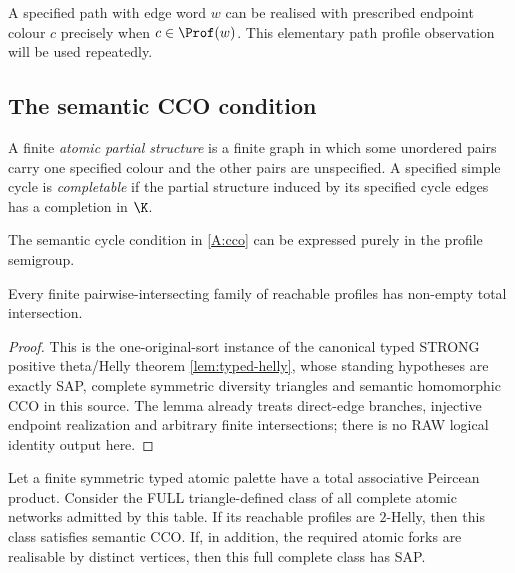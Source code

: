 A specified path with edge word \(w\) can be realised with prescribed
endpoint colour \(c\) precisely when \(c\in\Prof(w)\).  This elementary path
profile observation will be used repeatedly.

\subsection{The semantic CCO condition}

\begin{definition}
A finite \emph{atomic partial structure} is a finite graph in which some
unordered pairs carry one specified colour and the other pairs are
unspecified.  A specified simple cycle is \emph{completable} if the partial
structure induced by its specified cycle edges has a completion in \(\K\).
\end{definition}

The semantic cycle condition in \cref{A:cco} can be expressed purely in the
profile semigroup.

\begin{proposition}\label{prop:cco-helly}
Every finite pairwise-intersecting family of reachable profiles has non-empty
total intersection.
\end{proposition}

\begin{proof}
This is the one-original-sort instance of the
canonical typed STRONG positive theta/Helly theorem
\cref{lem:typed-helly}, whose standing hypotheses
are exactly SAP, complete symmetric diversity triangles
and semantic homomorphic CCO in this source.
The lemma already treats direct-edge branches, injective
endpoint realization and arbitrary finite intersections;
there is no RAW logical identity output here.
\end{proof}

\begin{lemma}\label{lem:helly-to-cco}
Let a finite symmetric typed atomic palette have a total associative Peircean
product.  Consider the FULL triangle-defined class of all complete atomic
networks admitted by this table. If its reachable profiles are
\(2\)-Helly, then this class satisfies semantic CCO. If, in
addition, the required atomic forks are realisable by distinct
vertices, then this full complete class has SAP.
\end{lemma}


